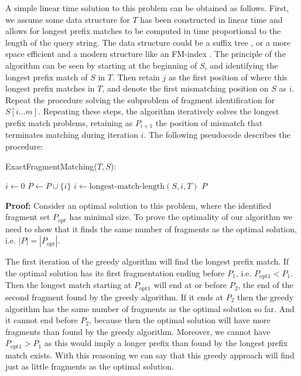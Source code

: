 A simple linear time solution to this problem can be obtained as
follows. First, we assume some data structure for $T$ has been
constructed in linear time and allows for longest prefix matches to be
computed in time proportional to the length of the query string. The
data structure could be a suffix tree \citep{mccreight1976space}, or a
more space efficient and a modern structure like an FM-index
\citep{ferragina2000opportunistic}. The principle of the algorithm can be
seen by starting at the beginning of $S$, and identifying the longest
prefix match of $S$ in $T$. Then retain $j$ as the first position of
where this longest prefix matches in $T$, and denote the first
mismatching position on $S$ as $i$. Repeat the procedure solving the
subproblem of fragment identification for $S[i\dots m]$. Repeating these
steps, the algorithm iteratively solves the longest prefix match
problems, retaining as $P_{i+1}$ the position of mismatch that
terminates matching during iteration $i$. The following pseudocode
describes the procedure:

\begin{algorithm}[H]
\caption{ExactFragmentMatching($T, S$):}
\begin{algorithmic}[1]
  \STATE $i \leftarrow 0$
    \STATE $P \leftarrow P\cup \{i\}$
    \STATE $i \leftarrow \text{longest-match-length}(S,i,T)$
  \ENDWHILE
  \RETURN $P$
\end{algorithmic}
\end{algorithm}

\textbf{Proof:} Consider an optimal solution to this problem, where the
identified fragment set $P_{\mathrm{opt}}$ has minimal size. To prove
the optimality of our algorithm we need to show that it finds the same
number of fragments as the optimal solution, i.e. $|P| =
|P_{\mathrm{opt}}|$.

The first iteration of the greedy algorithm will find the longest prefix
match. If the optimal solution has its first fragmentation ending before
$P_1$, i.e. $P_{\mathrm{opt1}} < P_1$. Then the longest match starting at
$P_{\mathrm{opt1}}$ will end at or before $P_2$, the end of the second
fragment found by the greedy algorithm. If it ends at $P_2$ then the
greedy algorithm has the same number of fragments as the optimal
solution so far. And it cannot end before $P_2$, because then the
optimal solution will have more fragments than found by the greedy
algorithm. Moreover, we cannot have $P_{\mathrm{opt1}} > P_1$ as this
would imply a longer prefix than found by the longest prefix match
exists. With this reasoning we can say that this greedy approach will
find just as little fragments as the optimal solution.

